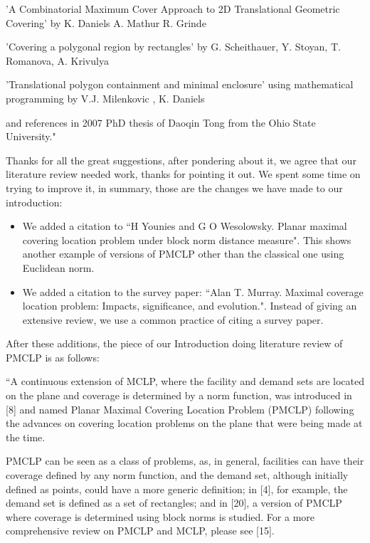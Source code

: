 		'A Combinatorial Maximum Cover Approach to 2D Translational Geometric Covering' by K. Daniels A. Mathur R. Grinde
		
		'Covering a polygonal region by rectangles' by G. Scheithauer, Y. Stoyan, T. Romanova, A. Krivulya
		
		'Translational polygon containment and minimal enclosure' using mathematical programming
		by V.J. Milenkovic , K. Daniels
		
		and references in 2007 PhD thesis of Daoqin Tong from the Ohio State University."
		
		Thanks for all the great suggestions, after pondering about it, we agree that our literature review needed work, thanks for pointing it out.
		We spent some time on trying to improve it, in summary, those are the changes we have made to our introduction:

		\begin{itemize}
			\item We added a citation to ``H Younies and G O Wesolowsky. Planar maximal covering location problem under block norm distance measure". This shows another example of versions of PMCLP other than the classical one using Euclidean norm.
			\item We added a citation to the survey paper: ``Alan T. Murray. Maximal coverage location problem: Impacts, significance, and evolution.". Instead of giving an extensive review, we use a common practice of citing a survey paper. 
		\end{itemize}
	
	After these additions, the piece of our Introduction doing literature review of PMCLP is as follows:
	
	``A continuous extension of MCLP, where the facility and demand sets are located on the plane and coverage is determined by a norm function, was introduced in [8] and named Planar Maximal	Covering Location Problem (PMCLP) following the advances on covering location problems on the	plane that were being made at the time.
	
	PMCLP can be seen as a class of problems, as, in general, facilities can have their coverage
	defined by any norm function, and the demand set, although initially defined as points, could have a more generic definition; in [4], for example, the demand set is defined as a set of rectangles; and in [20], a version of PMCLP where coverage is determined using block norms is studied. For a more comprehensive review on PMCLP and MCLP, please see [15].
	
